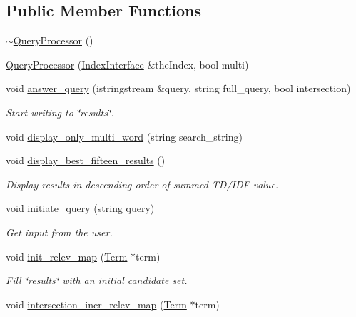 \subsection*{Public Member Functions}
\begin{DoxyCompactItemize}
\item 
\hyperlink{class_query_processor_ac4bebae67b0c08004f26f55957428574}{$\sim$\+Query\+Processor} ()
\item 
\hyperlink{class_query_processor_ac26c0e04d7fd486654a855c7e53027dd}{Query\+Processor} (\hyperlink{class_index_interface}{Index\+Interface} \&the\+Index, bool multi)
\item 
void \hyperlink{class_query_processor_ae54c39816f93865605311fbee9d09d08}{answer\+\_\+query} (istringstream \&query, string full\+\_\+query, bool intersection)
\begin{DoxyCompactList}\small\item\em Start writing to \char`\"{}results\char`\"{}. \end{DoxyCompactList}\item 
void \hyperlink{class_query_processor_ac2e8b45fe91cbcebf9ec32a50e019df6}{display\+\_\+only\+\_\+multi\+\_\+word} (string search\+\_\+string)
\item 
void \hyperlink{class_query_processor_a3e93e0a00cd935ee71497623c8e6d4ad}{display\+\_\+best\+\_\+fifteen\+\_\+results} ()
\begin{DoxyCompactList}\small\item\em Display results in descending order of summed T\+D/\+I\+D\+F value. \end{DoxyCompactList}\item 
void \hyperlink{class_query_processor_ae59525962d93a0087fee0afd689ce1e3}{initiate\+\_\+query} (string query)
\begin{DoxyCompactList}\small\item\em Get input from the user. \end{DoxyCompactList}\item 
void \hyperlink{class_query_processor_ae1f3fdd94b58ac3016ab04873145fec7}{init\+\_\+relev\+\_\+map} (\hyperlink{class_term}{Term} $\ast$term)
\begin{DoxyCompactList}\small\item\em Fill \char`\"{}results\char`\"{} with an initial candidate set. \end{DoxyCompactList}\item 
void \hyperlink{class_query_processor_a29d1767fe229ea175488976673463dcb}{intersection\+\_\+incr\+\_\+relev\+\_\+map} (\hyperlink{class_term}{Term} $\ast$term)

\end{DoxyCompactItemize}
